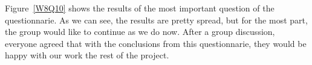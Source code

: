 Figure~\ref{W8Q10} shows the results of the most important question of the questionnarie. As we can see, the results are pretty spread, but for the most part, the group would like to continue as we do now. After a group discussion, everyone agreed that with the conclusions from this questionnarie, they would be happy with our work the rest of the project. 
